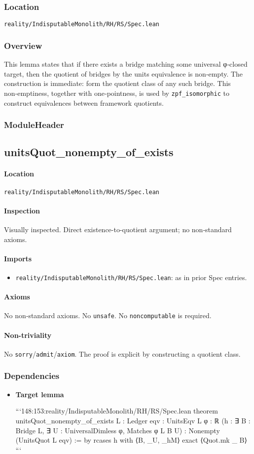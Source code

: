 \documentclass{article}
\newcommand{\FileRef}[1]{\texttt{#1}}
\newcommand{\ModuleHeader}[3]{%
  \subsection{#1}
  \paragraph{Location} \FileRef{#2}\\
  \paragraph{Inspection} #3
}
\begin{document}
\subsubsection{Location}
\FileRef{reality/IndisputableMonolith/RH/RS/Spec.lean}

\subsubsection{Overview}
This lemma states that if there exists a bridge matching some universal φ‑closed target, then the quotient of bridges by the units equivalence is non‑empty. The construction is immediate: form the quotient class of any such bridge. This non‑emptiness, together with one‑pointness, is used by \texttt{zpf\_isomorphic} to construct equivalences between framework quotients.

\subsubsection{ModuleHeader}
\ModuleHeader{unitsQuot\_nonempty\_of\_exists}{reality/IndisputableMonolith/RH/RS/Spec.lean}{Visually inspected. Direct existence-to-quotient argument; no non‑standard axioms.}

\paragraph{Imports}
\begin{itemize}[leftmargin=*]
  \item \FileRef{reality/IndisputableMonolith/RH/RS/Spec.lean}: as in prior Spec entries.
\end{itemize}

\paragraph{Axioms}
No non‑standard axioms. No \texttt{unsafe}. No \texttt{noncomputable} is required.

\paragraph{Non-triviality}
No \texttt{sorry}/\texttt{admit}/\texttt{axiom}. The proof is explicit by constructing a quotient class.

\subsubsection{Dependencies}
\begin{itemize}[leftmargin=*]
  \item \textbf{Target lemma}

```148:153:reality/IndisputableMonolith/RH/RS/Spec.lean
theorem unitsQuot_nonempty_of_exists {L : Ledger} {eqv : UnitsEqv L}
  {φ : ℝ} (h : ∃ B : Bridge L, ∃ U : UniversalDimless φ, Matches φ L B U) :
  Nonempty (UnitsQuot L eqv) := by
  rcases h with ⟨B, _U, _hM⟩
  exact ⟨Quot.mk _ B⟩
```
\end{itemize}
\end{document}
